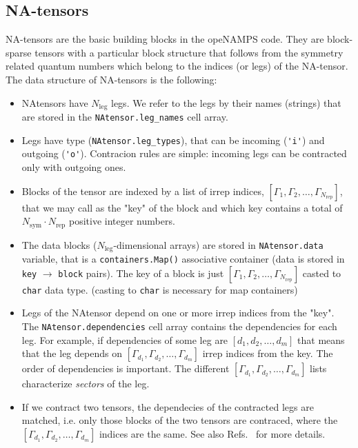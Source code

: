 \documentclass[aps,prb,twocolumn,showpacs,preprintnumbers,amsmath,amssymb, superscriptaddressm, nofootinbib]{revtex4-2}   %
\newcommand{\sym}{\mathrm{sym}}
\newcommand{\leg}{\mathrm{leg}}
\newcommand{\rep}{\mathrm{rep}}
\begin{document}
\subsection{NA-tensors}
NA-tensors are the basic building blocks in the opeNAMPS code. They are block-sparse tensors with a particular block structure that follows from the symmetry related quantum numbers which belong to the indices (or legs) of the NA-tensor. The data structure of NA-tensors is the following: 
\begin{itemize}
    \item NAtensors have $N_\leg$ legs. We refer to the legs by their names (strings) that are stored in the \verb|NAtensor.leg_names| cell array.
    \item Legs have type (\verb|NAtensor.leg_types|), that can be incoming (\verb|'i'|) and outgoing (\verb|'o'|). Contracion rules are simple: incoming legs can be contracted only with outgoing ones.
    \item Blocks of the tensor are indexed by a list of irrep indices, $[\Gamma_1, \Gamma_2, \dots, \Gamma_{N_\rep}]$, that we may call as the "key" of the block and which key contains a total of $N_\sym \cdot N_\rep$ positive integer numbers. 
    \item The data blocks ($N_\leg$-dimensional arrays) are stored in \verb|NAtensor.data| variable, that is a \verb|containers.Map()| associative container (data is stored in \verb|key| $\rightarrow$ \verb|block| pairs). The key of a block is just $[\Gamma_1, \Gamma_2, \dots, \Gamma_{N_\rep}]$ casted to \verb|char| data type. (casting to \verb|char| is necessary for map containers)
    \item Legs of the NAtensor depend on one or more irrep indices from the "key". The \verb|NAtensor.dependencies| cell array contains the dependencies for each leg. For example, if dependencies of some leg are $[d_1, d_2, \dots, d_m]$ that means that the leg depends on $[\Gamma_{d_1}, \Gamma_{d_2}, \dots, \Gamma_{d_m}]$ irrep indices from the key. The order of dependencies is important. The different $[\Gamma_{d_1}, \Gamma_{d_2}, \dots, \Gamma_{d_m}]$ lists characterize \emph{sectors} of the leg. 
    \item If we contract two tensors, the dependecies of the contracted legs are matched, i.e. only those blocks of the two tensors are contraced, where the  $[\Gamma_{d_1}, \Gamma_{d_2}, \dots, \Gamma_{d_m}]$ indices are the same. See also Refs.~ for more details. 
\end{itemize}
\end{document}
